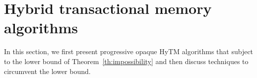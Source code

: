\section{Hybrid transactional memory algorithms}\label{sec:hytmalgos}
%
%
In this section, we first present progressive opaque HyTM algorithms that subject to the lower bound
of Theorem~\ref{th:impossibility} and then discuss techniques to circumvent the lower bound.
%

%
%